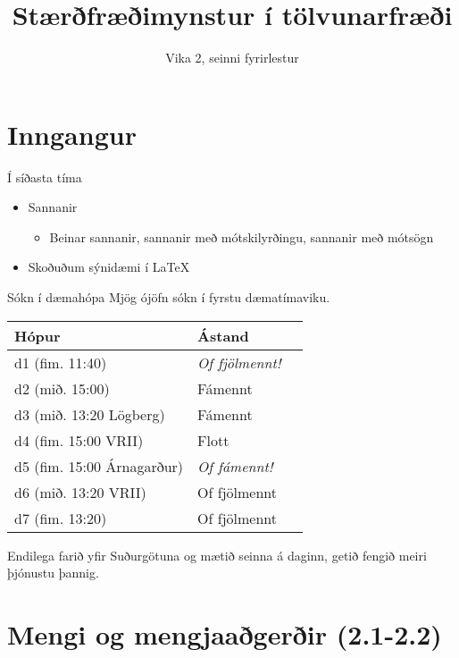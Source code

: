 \documentclass{beamer}
\title{Stærðfræðimynstur í tölvunarfræði}
\subtitle{Vika 2, seinni fyrirlestur}
\begin{document}
\begin{frame}
\titlepage
\end{frame}

\section{Inngangur}

\begin{frame}{Í síðasta tíma}
    \begin{itemize}
        \item Sannanir
        \begin{itemize}
            \item Beinar sannanir, sannanir með mótskilyrðingu, sannanir með mótsögn
        \end{itemize}
        \item Skoðuðum sýnidæmi í \LaTeX
    \end{itemize}
\end{frame}

\begin{frame}{Sókn í dæmahópa}
    Mjög ójöfn sókn í fyrstu dæmatímaviku.
    \begin{center}
        \begin{tabular}{lll}
            \toprule
            Hópur&Ástand\\
            \midrule
            d1 (fim. 11:40)&\emph{Of fjölmennt!}\\
            d2 (mið. 15:00)&Fámennt\\
            d3 (mið. 13:20 Lögberg)&Fámennt\\
            d4 (fim. 15:00 VRII)&Flott\\
            d5 (fim. 15:00 Árnagarður)&\emph{Of fámennt!}\\
            d6 (mið. 13:20 VRII)&Of fjölmennt\\
            d7 (fim. 13:20)& Of fjölmennt\\
            \bottomrule
        \end{tabular}
    \end{center}
    Endilega farið yfir Suðurgötuna og mætið seinna á daginn, getið fengið meiri þjónustu þannig.
\end{frame}

\section{Mengi og mengjaaðgerðir (2.1-2.2)}
\end{document}
